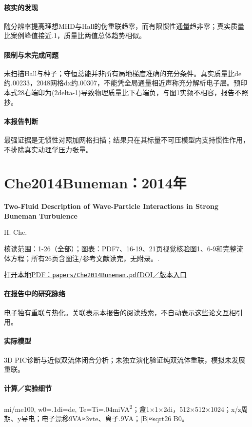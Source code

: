 \paragraph{核实的发现}随分辨率提高理想MHD与Hall的伪重联趋零，而有限惯性通量趋非零；真实质量比案例峰值接近.1，质量比两值总体趋势相似。

\paragraph{限制与未完成问题}未扫描Hall与种子；守恒总能并非所有局地梯度准确的充分条件。真实质量比de约.00233，2048网格dx约.00307，不能凭全局通量相近声称充分解析电子层。预印本式28右端印为(2delta-1)导致物理质量比下右端负，与图1实频不相容，报告不照抄。

\paragraph{本报告判断}最强证据是无惯性对照加网格扫描；结果只在其标量不可压模型内支持惯性作用，不排除真实动理学压力张量。

\section{Che2014Buneman：2014年}\label{paper:Che2014Buneman}

\textbf{Two-Fluid Description of Wave-Particle Interactions in Strong Buneman Turbulence}\citep{Che2014Buneman}\

H. Che.

\textsf{核读范围：}1-26（全部）；\textsf{图表：}PDF7、16-19、21页视觉核验图1、6-9和完整流体方程；所有26页含图注/参考文献读完，无附录。.

\href{run:papers/Che2014Buneman.pdf}{打开本地PDF：\texttt{papers/Che2014Buneman.pdf}}\quad\href{https://doi.org/10.1063/1.4882677}{DOI／版本入口}

\paragraph{在报告中的研究脉络}\hyperref[story:energy]{电子独有重联与热化}。关联表示本报告的阅读线索，不自动表示这些论文互相引用。

\paragraph{实际模型}3D PIC诊断与近似双流体闭合分析；未独立演化验证纯双流体重联，模拟未发展重联。

\paragraph{计算／实验细节}mi/me100, w0=.1di=de, Te=Ti=.04miVA\textsuperscript{2}；盒1×1×2di，512×512×1024；x/z周期、y导电；电子漂移9VA≈3vte、离子.9VA；|B|≈sqrt26 B0。

